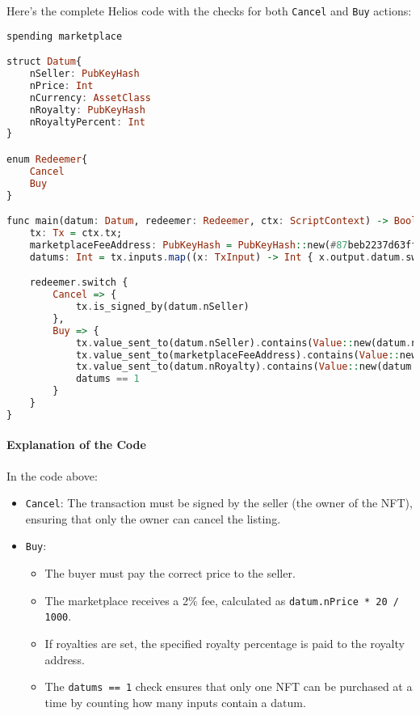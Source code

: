 Here's the complete Helios code with the checks for both \texttt{Cancel} and \texttt{Buy} actions:

\begin{lstlisting}[language=haskell, caption=Marketplace Contract with Cancel and Buy Flow]
spending marketplace

struct Datum{
    nSeller: PubKeyHash
    nPrice: Int
    nCurrency: AssetClass
    nRoyalty: PubKeyHash
    nRoyaltyPercent: Int
}

enum Redeemer{
    Cancel
    Buy
}

func main(datum: Datum, redeemer: Redeemer, ctx: ScriptContext) -> Bool {
    tx: Tx = ctx.tx;
    marketplaceFeeAddress: PubKeyHash = PubKeyHash::new(#87beb2237d63ff03bc842950a88959d69abbe29e8adea8176b32fd69);
    datums: Int = tx.inputs.map((x: TxInput) -> Int { x.output.datum.switch{None => 0, else => 1} }).fold((sum: Int, x: Int) -> Int { sum + x }, 0);

    redeemer.switch {
        Cancel => {
            tx.is_signed_by(datum.nSeller)
        },
        Buy => {
            tx.value_sent_to(datum.nSeller).contains(Value::new(datum.nCurrency, datum.nPrice)) &&
            tx.value_sent_to(marketplaceFeeAddress).contains(Value::new(datum.nCurrency, datum.nPrice * 20 / 1000)) &&
            tx.value_sent_to(datum.nRoyalty).contains(Value::new(datum.nCurrency, datum.nPrice * datum.nRoyaltyPercent / 1000)) &&
            datums == 1
        }
    }
}
\end{lstlisting}

\paragraph{Explanation of the Code}
In the code above:
\begin{itemize}
    \item \texttt{Cancel}: The transaction must be signed by the seller (the owner of the NFT), ensuring that only the owner can cancel the listing.
    \item \texttt{Buy}: 
        \begin{itemize}
            \item The buyer must pay the correct price to the seller.
            \item The marketplace receives a 2\% fee, calculated as \texttt{datum.nPrice * 20 / 1000}.
            \item If royalties are set, the specified royalty percentage is paid to the royalty address.
            \item The \texttt{datums == 1} check ensures that only one NFT can be purchased at a time by counting how many inputs contain a datum.
        \end{itemize}
\end{itemize}

